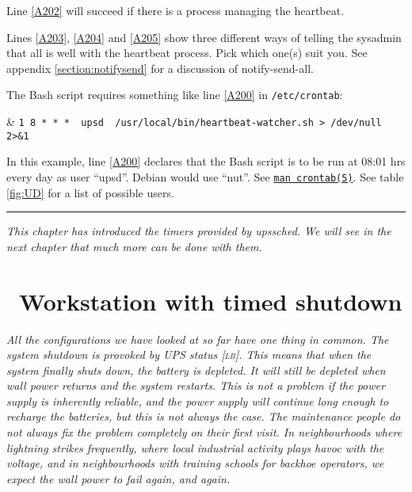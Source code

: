 \documentclass[12pt]{article}
\newlength{\headersep}\setlength{\headersep}{3mm}
\newcommand{\Hsep}{\hspace{\headersep}}
\newcommand{\newcolumn}{\vfill\eject}
\newcommand{\upssched}{\mbox{\textcolor{SCHEDCOLOUR}{upssched}}}
\newcommand{\notifysendall}{\mbox{\textcolor{NOTIFYCOLOUR}{notify-send-all}}}
\newcommand{\LB}{\textcolor{UPSDCOLOUR}{\textsc{lb}}}
\newcommand{\status}[1]{\textcolor{UPSDCOLOUR}{[{#1}]}}
\newcommand{\LINman}[2]{\href{https://man7.org/linux/man-pages/man#2/#1.#2.html}{\texttt{man #1(#2)}}}
\begin{document}
Line \ref{A202} will succeed if there is a process managing the heartbeat.

Lines \ref{A203}, \ref{A204} and \ref{A205} show three different ways of
telling the sysadmin that all is well with the heartbeat process.  Pick which
one(s) suit you.  See appendix \ref{section:notifysend} for a discussion of
\notifysendall.

The Bash script requires something like line \ref{A200} in \texttt{/etc/crontab}:

\begin{LinePrinter}[0.99\LinePrinterwidth]
\Clunk[A200]  & \verb`1 8 * * *  upsd  /usr/local/bin/heartbeat-watcher.sh > /dev/null 2>&1` \\
\end{LinePrinter}

In this example, line \ref{A200} declares that the Bash script is to be run at
08:01 hrs every day as user ``upsd''.  Debian would use ``nut''.  See
\LINman{crontab}{5}.  See table \ref{fig:UD} for a list of possible users.

\vspace*{\fill}
\begin{center}\rule{\LinePrinterwidth}{0.5mm}\end{center}
\vspace*{\fill}

\textsl{This chapter has introduced the timers provided by \upssched.
We will see in the next chapter that much more can be done with them.}

\vspace*{\fill}



\newcolumn
\section{\Hsep\ Workstation with timed shutdown}\label{section:bad}

\textsl{All the configurations we have looked at so far have one thing in
  common.  The system shutdown is provoked by UPS status \status{\LB}.  This
  means that when the system finally shuts down, the battery is depleted.  It
  will still be depleted when wall power returns and the system restarts.
  This is not a problem if the power supply is inherently reliable, and the
  power supply will continue long enough to recharge the batteries, but this
  is not always the case.  The maintenance people do not always fix the
  problem completely on their first visit. In neighbourhoods where lightning
  strikes frequently, where local industrial activity plays havoc with the
  voltage, and in neighbourhoods with training schools for backhoe operators,
  we expect the wall power to fail again, and again.}
\end{document}
